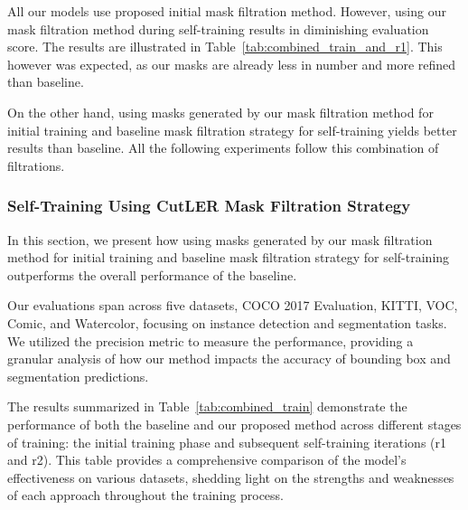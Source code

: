 All our models use proposed initial mask filtration method. However, using our mask filtration method during self-training results in diminishing evaluation score. The results are illustrated in Table~\ref{tab:combined_train_and_r1}. This however was expected, as our masks are already less in number and more refined than baseline.

On the other hand, using masks generated by our mask filtration method for initial training and baseline mask filtration strategy for self-training yields better results than baseline. All the following experiments follow this combination of filtrations.

\subsubsection{Self-Training Using CutLER Mask Filtration Strategy}

In this section, we present how using masks generated by our mask filtration method for initial training and baseline mask filtration strategy for self-training outperforms the overall performance of the baseline. 

Our evaluations span across five datasets, COCO 2017 Evaluation, KITTI, VOC, Comic, and Watercolor, focusing on instance detection and segmentation tasks. We utilized the precision metric to measure the performance, providing a granular analysis of how our method impacts the accuracy of bounding box and segmentation predictions.

The results summarized in Table~\ref{tab:combined_train} demonstrate the performance of both the baseline and our proposed method across different stages of training: the initial training phase and subsequent self-training iterations (r1 and r2). This table provides a comprehensive comparison of the model’s effectiveness on various datasets, shedding light on the strengths and weaknesses of each approach throughout the training process.


